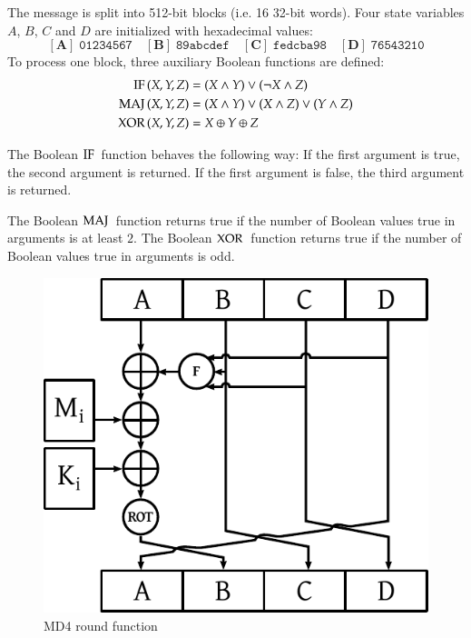 The message is split into 512-bit blocks (i.e. 16 32-bit words).
Four state variables $A$, $B$, $C$ and $D$ are initialized with hexadecimal values:
\[
  \mathbf{[A]}\; \mathtt{01234567} \quad
  \mathbf{[B]}\; \mathtt{89abcdef} \quad
  \mathbf{[C]}\; \mathtt{fedcba98} \quad
  \mathbf{[D]}\; \mathtt{76543210}
\]
To process one block, three auxiliary Boolean functions are defined:
\begin{align}
  \operatorname{\text{IF\,}}(X,Y,Z) &= (X \land Y) \lor (\neg X \land Z) \\
  \operatorname{\text{MAJ\,}}(X,Y,Z) &= (X \land Y) \lor (X \land Z) \lor (Y \land Z) \\
  \operatorname{\text{XOR\,}}(X,Y,Z) &= X \oplus Y \oplus Z
\end{align}

\begin{defi}
  The Boolean $\operatorname{\text{IF\,}}$ function behaves the following way:
  If the first argument is true, the second argument is returned.
  If the first argument is false, the third argument is returned.

  The Boolean $\operatorname{\text{MAJ\,}}$ function returns true if the number
  of Boolean values true in arguments is at least $2$.
  The Boolean $\operatorname{\text{XOR\,}}$ function returns true if the number
  of Boolean values true in arguments is odd.
\end{defi}

\begin{figure}[t]
  \begin{center}
    \includegraphics{img/md4.pdf}
    \caption{MD4 round function}
    \label{fig:md4-round-function}
  \end{center}
\end{figure}

